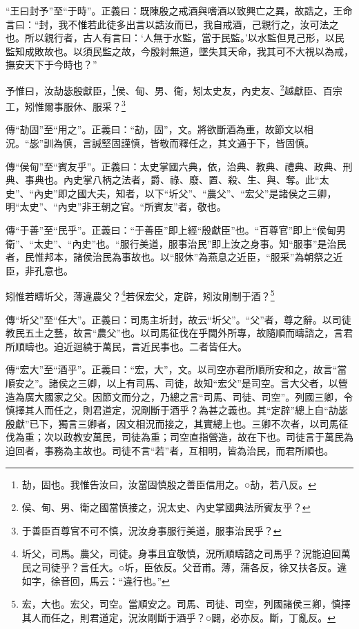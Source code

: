 {\noindent\shu{}\fzkt “王曰封予”至“于時”。正義曰：既陳殷之戒酒與嗜酒以致興亡之異，故誥之，王命言曰：“封，我不惟若此徒多出言以誥汝而已，我自戒酒，己親行之，汝可法之也。所以親行者，古人有言曰：‘人無于水監，當于民監。’以水監但見己形，以民監知成敗故也。以須民監之故，今殷紂無道，墜失其天命，我其可不大視以為戒，撫安天下于今時也？” \par}

予惟曰，汝劼毖殷獻臣，\footnote{劼，固也。我惟告汝曰，汝當固慎殷之善臣信用之。○劼，若八反。}侯、甸、男、衛，矧太史友，內史友、\footnote{侯、甸、男、衛之國當慎接之，況太史、內史掌國典法所賓友乎？}越獻臣、百宗工，矧惟爾事服休、服采？\footnote{于善臣百尊官不可不慎，況汝身事服行美道，服事治民乎？}



{\noindent\zhuan{}\fzbyks 傳“劼固”至“用之”。正義曰：“劼，固”，文。將欲斷酒為重，故節文以相況。“毖”訓為慎，言誠堅固謹慎，皆敬而釋任之，其文通于下，皆固慎。 \par}

{\noindent\zhuan{}\fzbyks 傳“侯甸”至“賓友乎”。正義曰：太史掌國六典，依，治典、教典、禮典、政典、刑典、事典也。內史掌八柄之法者，爵、祿、廢、置、殺、生、與、奪。此“太史”、“內史”即之國大夫，知者，以下“圻父”、“農父”、“宏父”是諸侯之三卿，明“太史”、“內史”非王朝之官。“所賓友”者，敬也。 \par}

{\noindent\zhuan{}\fzbyks 傳“于善”至“民乎”。正義曰：“于善臣”即上經“殷獻臣”也。“百尊官”即上“侯甸男衛”、“太史”、“內史”也。“服行美道，服事治民”即上汝之身事。知“服事”是治民者，民惟邦本，諸侯治民為事故也。以“服休”為燕息之近臣，“服采”為朝祭之近臣，非孔意也。 \par}

矧惟若疇圻父，薄違農父？\footnote{圻父，司馬。農父，司徒。身事且宜敬慎，況所順疇諮之司馬乎？況能迫回萬民之司徒乎？言任大。○圻，臣依反。父音甫。薄，蒲各反，徐又扶各反。違如字，徐音回，馬云：“違行也。”}若保宏父，定辟，矧汝剛制于酒？\footnote{宏，大也。宏父，司空。當順安之。司馬、司徒、司空，列國諸侯三卿，慎擇其人而任之，則君道定，況汝剛斷于酒乎？○闢，必亦反。斷，丁亂反。}

{\noindent\zhuan{}\fzbyks 傳“圻父”至“任大”。正義曰：司馬主圻封，故云“圻父”。“父”者，尊之辭。以司徒教民五土之藝，故言“農父”也。以司馬征伐在乎閫外所專，故隨順而疇諮之，言君所順疇也。迫近迴繞于萬民，言近民事也。二者皆任大。 \par}

{\noindent\zhuan{}\fzbyks 傳“宏大”至“酒乎”。正義曰：“宏，大”，文。以司空亦君所順所安和之，故言“當順安之”。諸侯之三卿，以上有司馬、司徒，故知“宏父”是司空。言大父者，以營造為廣大國家之父。因節文而分之，乃總之言“司馬、司徒、司空”。列國三卿，令慎擇其人而任之，則君道定，況剛斷于酒乎？為甚之義也。其“定辟”總上自“劼毖殷獻”已下，獨言三卿者，因文相況而接之，其實總上也。三卿不次者，以司馬征伐為重；次以政教安萬民，司徒為重；司空直指營造，故在下也。司徒言于萬民為迫回者，事務為主故也。司徒不言“若”者，互相明，皆為治民，而君所順也。 \par}

